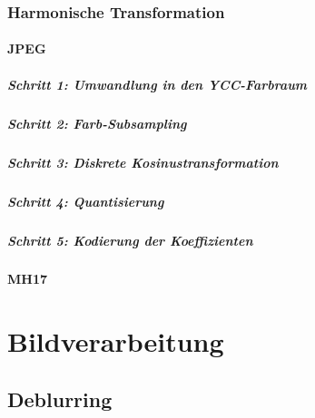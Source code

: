 \documentclass[a4paper, 11pt, accentcolor = tud3b]{tudreport}
\begin{document}
			\subsection{Harmonische Transformation} %

				\subsubsection{JPEG} %

					\paragraph{Schritt 1: Umwandlung in den YCC-Farbraum} %

					\paragraph{Schritt 2: Farb-Subsampling} %

					\paragraph{Schritt 3: Diskrete Kosinustransformation} %

					\paragraph{Schritt 4: Quantisierung} %

					\paragraph{Schritt 5: Kodierung der Koeffizienten} %

				\subsubsection{MH17} %

	\chapter{Bildverarbeitung} %

		\section{Deblurring} %
\end{document}
